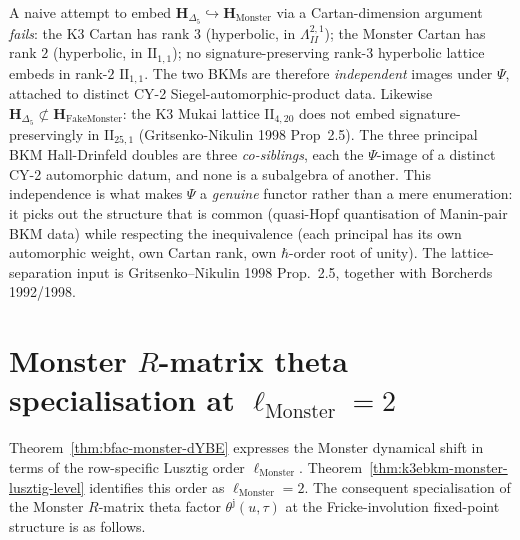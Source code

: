 \begin{remark}
\label{rem:bfac-k3-monster-distinct-psi-images}
A naive attempt to embed $\mathbf H_{\Delta_5}\hookrightarrow\mathbf H_{\mathrm{Monster}}$
via a Cartan-dimension argument \emph{fails}: the K3 Cartan has rank
$3$ (hyperbolic, in $\Lambda^{2,1}_{II}$); the Monster Cartan has
rank $2$ (hyperbolic, in $\mathrm{II}_{1,1}$); no signature-preserving
rank-$3$ hyperbolic lattice embeds in rank-$2$ $\mathrm{II}_{1,1}$.
The two BKMs are therefore \emph{independent} images under $\Psi$,
attached to distinct CY-2 Siegel-automorphic-product data. Likewise
$\mathbf H_{\Delta_5}\not\subset\mathbf H_{\mathrm{FakeMonster}}$: the
K3 Mukai lattice $\mathrm{II}_{4,20}$ does not embed signature-preservingly
in $\mathrm{II}_{25,1}$ (Gritsenko-Nikulin 1998 Prop~2.5). The
three principal BKM Hall-Drinfeld doubles are three \emph{co-siblings},
each the $\Psi$-image of a distinct CY-2 automorphic datum, and none
is a subalgebra of another. This independence is what makes $\Psi$
a \emph{genuine} functor rather than a mere enumeration: it picks out
the structure that is common (quasi-Hopf quantisation of Manin-pair
BKM data) while respecting the inequivalence (each principal has its
own automorphic weight, own Cartan rank, own $\hbar$-order root of
unity). The lattice-separation input is Gritsenko--Nikulin 1998
Prop.~2.5, together with Borcherds 1992/1998.
\end{remark}

\section{Monster \texorpdfstring{$R$}{R}-matrix theta specialisation at \texorpdfstring{$\ell_{\mathrm{Monster}} = 2$}{l-Monster = 2}}
\label{sec:bfac-monster-theta-specialisation}

Theorem~\ref{thm:bfac-monster-dYBE} expresses the Monster dynamical
shift in terms of the row-specific Lusztig order
$\ell_{\mathrm{Monster}}$. Theorem~\ref{thm:k3ebkm-monster-lusztig-level}
identifies this order as $\ell_{\mathrm{Monster}} = 2$. The consequent
specialisation of the
Monster $R$-matrix theta factor $\theta^{\mathrm j}(u,\tau)$ at the
Fricke-involution fixed-point structure is as follows.

